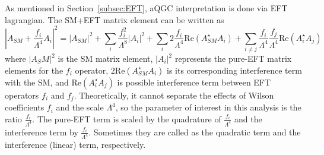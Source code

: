 As mentioned in Section~\ref{subsec:EFT}, aQGC interpretation is done via EFT lagrangian. 
The SM+EFT matrix element can be written as
\begin{equation}
   |A_{SM}+\frac{f_i}{\Lambda^4}A_i|^2=|A_{SM}|^2+\sum\limits_i \frac{f_i^2}{\Lambda^8}|A_{i}|^2+ \sum\limits_i 2 \frac{f_i}{\Lambda^4} \mathrm{Re}(A_{SM}^\star A_i) +\sum\limits_{i\neq j} \frac{f_i}{\Lambda^4} \frac{f_j}{\Lambda^4} \mathrm{Re}(A_i^\star A_j)
\end{equation}
where $|A_SM|^2$ is the SM matrix element, $|A_{i}|^2$ represents the pure-EFT matrix elements for the $f_{i}$ operator, $2 \mathrm{Re}(A_{SM}^\star A_i)$ is its corresponding interference term with the SM, and $\mathrm{Re}(A_i^\star A_j)$ is possible interference term between EFT operators $f_{i}$ and $f_{j}$. 
Theoretically, it cannot separate the effects of Wilson coefficients $f_i$ and the scale $\Lambda^4$, so the parameter of interest in this analysis is the ratio $\frac{f_i}{\Lambda^4}$. %
The pure-EFT term is scaled by the quadrature of $\frac{f_i}{\Lambda^4}$ and the interference term by $\frac{f_{i}}{\Lambda^4}$.
Sometimes they are called as the quadratic term and the interference (linear) term, respectively.

